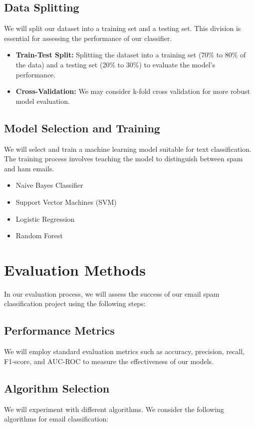 \documentclass[conference]{IEEEtran}
\begin{document}
\subsection{Data Splitting}
We will split our dataset into a training set and a testing set. This division is essential for assessing the performance of our classifier.

\begin{itemize}
    \item \textbf{Train-Test Split:} Splitting the dataset into a training set (70\% to 80\% of the data) and a testing set (20\% to 30\%) to evaluate the model's performance.
    \item \textbf{Cross-Validation:} We may consider k-fold cross validation for more robust model evaluation.
\end{itemize}

\subsection{Model Selection and Training}
We will select and train a machine learning model suitable for text classification. The training process involves teaching the model to distinguish between spam and ham emails.

\begin{itemize}
    \item Naive Bayes Classifier
    \item Support Vector Machines (SVM)
    \item Logistic Regression
    \item Random Forest
\end{itemize}

\section{Evaluation Methods}
In our evaluation process, we will assess the success of our email spam classification project using the following steps:

\subsection{Performance Metrics} We will employ standard evaluation metrics such as accuracy, precision, recall, F1-score, and AUC-ROC to measure the effectiveness of our models.

\subsection{Algorithm Selection} We will experiment with different algorithms. We consider the following algorithms for email classification:
\end{document}
